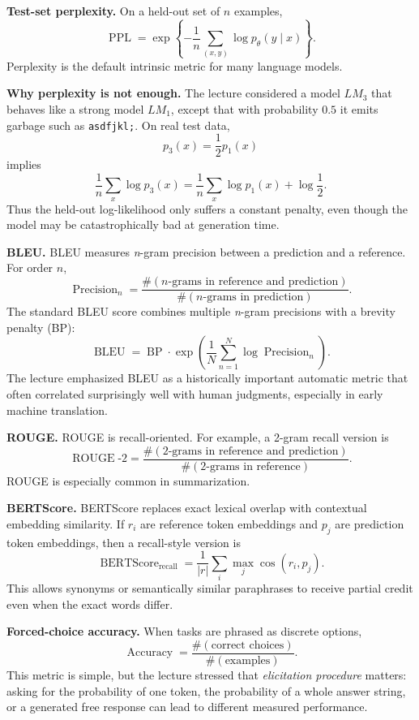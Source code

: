 \documentclass[11pt]{article}
\begin{document}
\textbf{Test-set perplexity.} On a held-out set of \(n\) examples,
\[
\operatorname{PPL} = \exp\left\{-\frac{1}{n}\sum_{(x,y)} \log p_\theta(y \mid x)\right\}.
\]
Perplexity is the default intrinsic metric for many language models.

\textbf{Why perplexity is not enough.} The lecture considered a model \(LM_3\) that behaves like a strong model \(LM_1\), except that with probability \(0.5\) it emits garbage such as \texttt{asdfjkl;}. On real test data,
\[
p_3(x) = \frac{1}{2}p_1(x)
\]
implies
\[
\frac{1}{n}\sum_x \log p_3(x)
=
\frac{1}{n}\sum_x \log p_1(x) + \log\frac{1}{2}.
\]
Thus the held-out log-likelihood only suffers a constant penalty, even though the model may be catastrophically bad at generation time.

\textbf{BLEU.} BLEU measures \emph{n}-gram precision between a prediction and a reference. For order \(n\),
\[
\operatorname{Precision}_n
=
\frac{\#(\text{\(n\)-grams in reference and prediction})}
{\#(\text{\(n\)-grams in prediction})}.
\]
The standard BLEU score combines multiple \emph{n}-gram precisions with a brevity penalty (BP):
\[
\operatorname{BLEU}
=
\operatorname{BP}\cdot
\exp\left(
\frac{1}{N}\sum_{n=1}^{N}\log \operatorname{Precision}_n
\right).
\]
The lecture emphasized BLEU as a historically important automatic metric that often correlated surprisingly well with human judgments, especially in early machine translation.

\textbf{ROUGE.} ROUGE is recall-oriented. For example, a 2-gram recall version is
\[
\operatorname{ROUGE}\text{-}2
=
\frac{\#(\text{2-grams in reference and prediction})}
{\#(\text{2-grams in reference})}.
\]
ROUGE is especially common in summarization.

\textbf{BERTScore.} BERTScore replaces exact lexical overlap with contextual embedding similarity. If \(r_i\) are reference token embeddings and \(p_j\) are prediction token embeddings, then a recall-style version is
\[
\operatorname{BERTScore}_{\text{recall}}
=
\frac{1}{|r|}
\sum_i \max_j \cos(r_i, p_j).
\]
This allows synonyms or semantically similar paraphrases to receive partial credit even when the exact words differ.

\textbf{Forced-choice accuracy.} When tasks are phrased as discrete options,
\[
\operatorname{Accuracy}
=
\frac{\#(\text{correct choices})}{\#(\text{examples})}.
\]
This metric is simple, but the lecture stressed that \emph{elicitation procedure} matters: asking for the probability of one token, the probability of a whole answer string, or a generated free response can lead to different measured performance.
\end{document}
